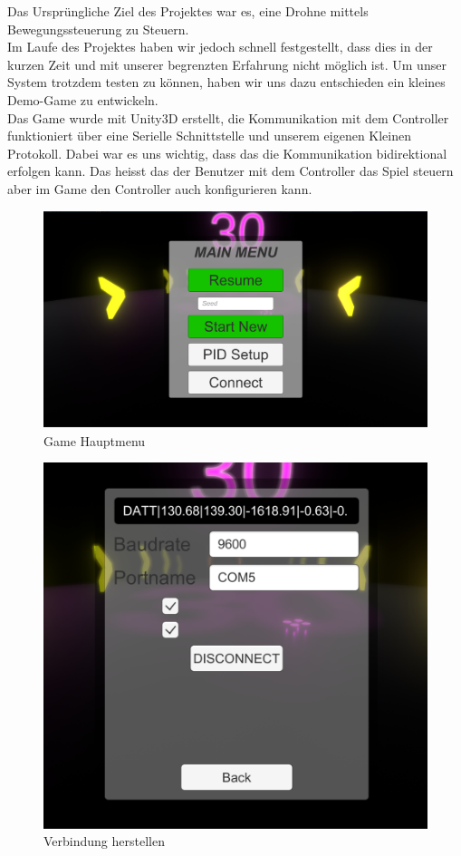 Das Ursprüngliche Ziel des Projektes war es, eine Drohne mittels Bewegungssteuerung zu Steuern.\\
Im Laufe des Projektes haben wir jedoch schnell festgestellt, dass dies in der kurzen Zeit und mit unserer begrenzten Erfahrung nicht möglich ist.
Um unser System trotzdem testen zu können, haben wir uns dazu entschieden ein kleines Demo-Game zu entwickeln.\\
Das Game wurde mit Unity3D erstellt, die Kommunikation mit dem Controller funktioniert über eine Serielle Schnittstelle und unserem eigenen Kleinen Protokoll.
Dabei war es uns wichtig, dass das die Kommunikation bidirektional erfolgen kann. Das heisst das der Benutzer mit dem Controller das Spiel steuern aber im Game den
Controller auch konfigurieren kann.\\

\begin{figure}[H]
  \begin{center}
    \includegraphics[width=0.6\linewidth]{content/images/menu1.png}
    \caption{Game Hauptmenu}
  \end{center}
\end{figure}

\begin{figure}[H]
  \begin{center}
    \includegraphics[width=0.6\linewidth]{content/images/connect.png}
    \caption{Verbindung herstellen}
  \end{center}
\end{figure}


